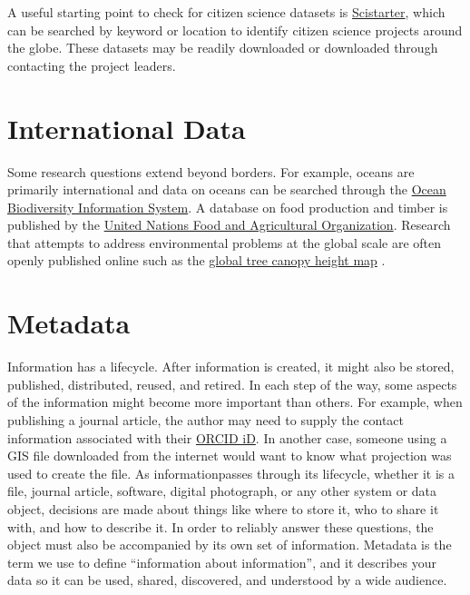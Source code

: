 \documentclass[
]{book}
\begin{document}
A useful starting point to check for citizen science datasets is \href{https://scistarter.org/}{Scistarter}, which can be searched by keyword or location to identify citizen science projects around the globe. These datasets may be readily downloaded or downloaded through contacting the project leaders.

\section{International Data}\label{international-data}

Some research questions extend beyond borders. For example, oceans are primarily international and data on oceans can be searched through the \href{https://obis.org/}{Ocean Biodiversity Information System}. A database on food production and timber is published by the \href{http://www.fao.org/faostat/en/}{United Nations Food and Agricultural Organization}. Research that attempts to address environmental problems at the global scale are often openly published online such as the \href{https://glad.umd.edu/dataset/gedi}{global tree canopy height map} \citep{potapov_mapping_2021}.

\section{Metadata}\label{metadata}

Information has a lifecycle. After information is created, it might also be stored, published, distributed, reused, and retired. In each step of the way, some aspects of the information might become more important than others. For example, when publishing a journal article, the author may need to supply the contact information associated with their \href{https://orcid.org/}{ORCID iD}. In another case, someone using a GIS file downloaded from the internet would want to know what projection was used to create the file. As informationpasses through its lifecycle, whether it is a file, journal article, software, digital photograph, or any other system or data object, decisions are made about things like where to store it, who to share it with, and how to describe it. In order to reliably answer these questions, the object must also be accompanied by its own set of information. Metadata is the term we use to define ``information about information'', and it describes your data so it can be used, shared, discovered, and understood by a wide audience.
\end{document}
